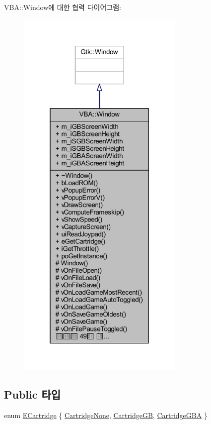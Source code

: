 V\+BA\+:\+:Window에 대한 협력 다이어그램\+:\nopagebreak
\begin{figure}[H]
\begin{center}
\leavevmode
\includegraphics[width=229pt]{class_v_b_a_1_1_window__coll__graph}
\end{center}
\end{figure}
\subsection*{Public 타입}
\begin{DoxyCompactItemize}
\item 
enum \mbox{\hyperlink{class_v_b_a_1_1_window_af580451d3ee7a738a73434858a08fa65}{E\+Cartridge}} \{ \mbox{\hyperlink{class_v_b_a_1_1_window_af580451d3ee7a738a73434858a08fa65ab67c77301849c1cfd10bdedc74191761}{Cartridge\+None}}, 
\mbox{\hyperlink{class_v_b_a_1_1_window_af580451d3ee7a738a73434858a08fa65a23a8d7e61dfcb4c1935477f7b9b80067}{Cartridge\+GB}}, 
\mbox{\hyperlink{class_v_b_a_1_1_window_af580451d3ee7a738a73434858a08fa65a64f96d20685b8bd757b1996f9d0cd906}{Cartridge\+G\+BA}}
 \}
\end{DoxyCompactItemize}
